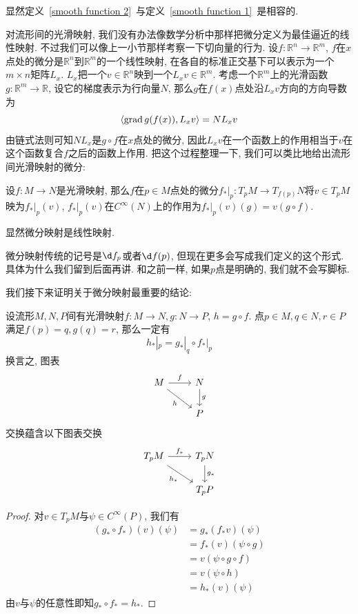 显然定义~\ref{smooth function 2}~与定义~\ref{smooth function 1}~是相容的.

对流形间的光滑映射, 我们没有办法像数学分析中那样把微分定义为最佳逼近的线性映射.
不过我们可以像上一小节那样考察一下切向量的行为.
设$f:\mathbb{R}^n\to\mathbb{R}^m$, $f$在$x$点处的微分是$\mathbb{R}^n$到$\mathbb{R}^m$的一个线性映射, 在各自的标准正交基下可以表示为一个$m\times n$矩阵$L_x$.
$L_x$把一个$v\in\mathbb{R}^n$映到一个$L_xv\in\mathbb{R}^m$.
考虑一个$\mathbb{R}^m$上的光滑函数$g:\mathbb{R}^m\to\mathbb{R}$, 设它的梯度表示为行向量$N$, 那么$g$在$f(x)$点处沿$L_xv$方向的方向导数为
\[\langle\operatorname{grad}{g(f(x))},L_xv\rangle=NL_xv\]
由链式法则可知$NL_x$是$g\circ f$在$x$点处的微分, 因此$L_xv$在一个函数上的作用相当于$v$在这个函数复合$f$之后的函数上作用.
把这个过程整理一下, 我们可以类比地给出流形间光滑映射的微分:

\begin{defn}
    设$f:M\to N$是光滑映射, 那么$f$在$p\in M$点处的微分$f_*|_p:T_pM\to T_{f(p)}N$将$v\in T_pM$映为$f_*|_p(v)$, $f_*|_p(v)$在$C^\infty(N)$上的作用为$f_*|_p(v)(g)=v(g\circ f)$.
\end{defn}

显然微分映射是线性映射.

\begin{sym}
    微分映射传统的记号是$\d f_p$或者$\d f(p)$, 但现在更多会写成我们定义的这个形式.
    具体为什么我们留到后面再讲.
    和之前一样, 如果$p$点是明确的, 我们就不会写脚标.
\end{sym}

我们接下来证明关于微分映射最重要的结论:

\begin{thm}[链式法则]设流形$M,N,P$间有光滑映射$f:M\to N,g:N\to P$, $h=g\circ f$.
    点$p\in M,q\in N,r\in P$满足$f(p)=q,g(q)=r$, 那么一定有
    \[h_*|_p=g_*|_q\circ f_*|_p\]
    换言之, 图表
    \[\begin{tikzcd}
        M \arrow[r, "f"] \arrow[dr, "h"'] & N \arrow[d, "g"]\\
        & P
    \end{tikzcd}\]
    交换蕴含以下图表交换
    \[\begin{tikzcd}
        T_pM \arrow[r, "f_*"] \arrow[dr, "h_*"'] & T_pN \arrow[d, "g_*"]\\
        & T_pP
    \end{tikzcd}\]
\end{thm}
\begin{proof}
    对$v\in T_pM$与$\psi\in C^\infty(P)$, 我们有
    \begin{align*}
        (g_*\circ f_*)(v)(\psi)&=g_*(f_*v)(\psi)\\
        &=f_*(v)(\psi\circ g)\\
        &=v(\psi\circ g\circ f)\\
        &=v(\psi\circ h)\\
        &=h_*(v)(\psi)
    \end{align*}
    由$v$与$\psi$的任意性即知$g_*\circ f_*=h_*$.
\end{proof}

